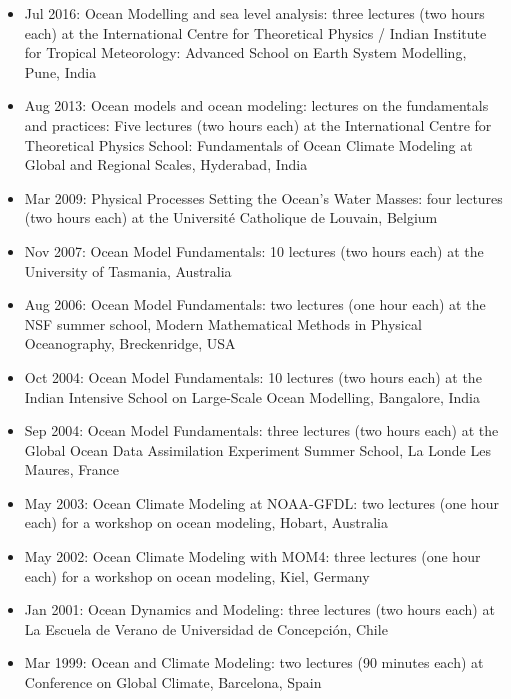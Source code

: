 \documentclass{article}
\begin{document}
\begin{itemize}[leftmargin=*]

\item Jul 2016: {\sc Ocean Modelling and sea level analysis}: three
  lectures (two hours each) at the International Centre for
  Theoretical Physics / Indian Institute for Tropical Meteorology:
  {\sc Advanced School on Earth System Modelling}, Pune, India

\item Aug 2013: {\sc Ocean models and ocean modeling: lectures on the
    fundamentals and practices}: Five lectures (two hours each) at the
  International Centre for Theoretical Physics School: {\sc
    Fundamentals of Ocean Climate Modeling at Global and Regional
    Scales}, Hyderabad, India

\item Mar 2009: {\sc Physical Processes Setting the Ocean's Water
    Masses}: four lectures (two hours each) at the Universit\'e
  Catholique de Louvain, Belgium

\item Nov 2007: {\sc Ocean Model Fundamentals}:  10 lectures (two hours each)  
at the University of Tasmania, Australia

\item Aug 2006: {\sc Ocean Model Fundamentals}: two lectures (one hour
  each) at the NSF summer school, {\sc Modern Mathematical Methods in
    Physical Oceanography}, Breckenridge, USA

\item Oct 2004: {\sc Ocean Model Fundamentals}: 10 lectures (two hours
  each) at the {\sc Indian Intensive School on Large-Scale Ocean Modelling},
  Bangalore, India

\item Sep 2004: {\sc Ocean Model Fundamentals}: three lectures (two
  hours each) at the {\sc Global Ocean Data Assimilation Experiment
    Summer School}, La Londe Les Maures, France

\item May 2003: {\sc Ocean Climate Modeling at NOAA-GFDL}: two
  lectures (one hour each) for a workshop on ocean modeling, Hobart,
  Australia

\item May 2002: {\sc Ocean Climate Modeling with MOM4}: three lectures
  (one hour each) for a workshop on ocean modeling, Kiel, Germany

\item Jan 2001: {\sc Ocean Dynamics and Modeling}: three lectures (two
  hours each) at La Escuela de Verano de Universidad de Concepci\'on,
  Chile

\item Mar 1999: {\sc Ocean and Climate Modeling}: two lectures (90
  minutes each) at {\sc Conference on Global Climate}, Barcelona,
  Spain

\end{itemize}
\end{document}
